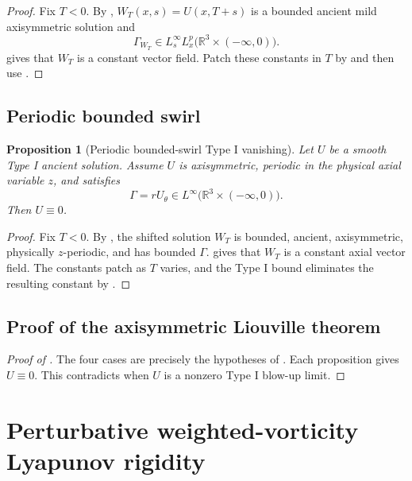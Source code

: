 \documentclass[11pt]{amsart}
\theoremstyle{plain}
\newtheorem{proposition}[proposition]{Proposition}
\theoremstyle{definition}
\theoremstyle{remark}
\numberwithin{equation}{section}
\begin{document}
\begin{proof}
Fix \(T<0\).  By , \(W_T(x,s)=U(x,T+s)\) is a bounded
ancient mild axisymmetric solution and
\[
   \Gamma_{W_T}\in L_s^\infty L_x^p
   \bigl(\mathbb R^3\times(-\infty,0)\bigr).
\]
 gives that \(W_T\) is a constant vector field.  Patch these
constants in \(T\) by  and then use
.
\end{proof}

\subsection{Periodic bounded swirl}

\begin{proposition}[Periodic bounded-swirl Type I vanishing]
\label{p3:prop:periodic-swirl-typeI}
Let \(U\) be a smooth Type I ancient solution.  Assume \(U\) is axisymmetric,
periodic in the physical axial variable \(z\), and satisfies
\[
   \Gamma=rU_\theta\in L^\infty
   \bigl(\mathbb R^3\times(-\infty,0)\bigr).
\]
Then \(U\equiv0\).
\end{proposition}

\begin{proof}
Fix \(T<0\).  By , the shifted solution \(W_T\) is
bounded, ancient, axisymmetric, physically \(z\)-periodic, and has bounded
\(\Gamma\).   gives that \(W_T\) is a constant axial vector
field.  The constants patch as \(T\) varies, and the Type I bound eliminates
the resulting constant by .
\end{proof}

\subsection{Proof of the axisymmetric Liouville theorem}

\begin{proof}[Proof of ]
The four cases are precisely the hypotheses of
.
Each proposition gives \(U\equiv0\).  This contradicts
 when \(U\) is a nonzero Type I blow-up limit.
\end{proof}

\section{Perturbative weighted-vorticity Lyapunov rigidity}
\label{p3:sec:weighted-vorticity}
\end{document}
